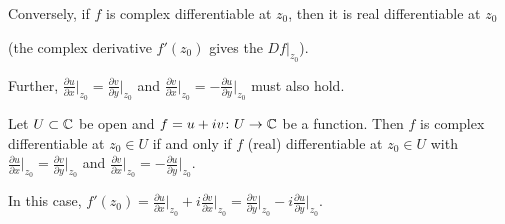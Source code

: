 \documentclass[10pt,aspectratio=169]{beamer}
\begin{document}
\begin{frame}

Conversely,
if $f$ is complex differentiable at $z_0$, then it is real
differentiable at $z_0$

(the complex derivative $f'(z_0)$ gives the $Df|_{z_0}$).

\medskip
\pause

Further,
$\frac{\partial u}{\partial x}\big|_{z_0} = \frac{\partial v}{\partial
y}\big|_{z_0}$ and $\frac{\partial v}{\partial x}\big|_{z_0} = -\frac{\partial
u}{\partial y}\big|_{z_0}$
must also hold.

\pause

\begin{proposition}
Let $U \subset {\mathbb{C}}$ be open and $f = u+iv \colon U \to {\mathbb{C}}$ be a function.
Then
$f$ is complex differentiable at $z_0 \in U$
if and only if
$f$ (real) differentiable at $z_0 \in U$
with
$\frac{\partial u}{\partial x}\big|_{z_0} =
\frac{\partial v}{\partial y}\big|_{z_0}$
and
$\frac{\partial v}{\partial x}\big|_{z_0} =
-\frac{\partial u}{\partial y}\big|_{z_0}$.

\pause
In this case,
$f'(z_0) = 
\frac{\partial u}{\partial x}\big|_{z_0} + i \frac{\partial v}{\partial
x}\big|_{z_0} = \frac{\partial v}{\partial y}\big|_{z_0} - i \frac{\partial
u}{\partial y}\big|_{z_0}$.
\end{proposition}

\end{frame}
\end{document}
